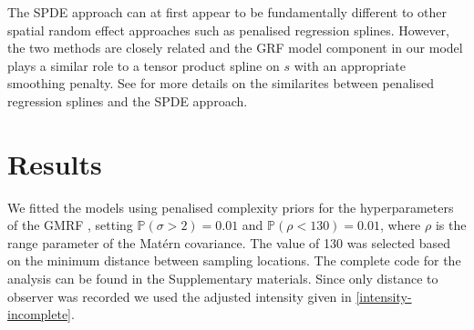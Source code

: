 \documentclass[preprint,12pt]{elsarticle}
\begin{document}
The SPDE approach can at first appear to be fundamentally different to other spatial random effect approaches such as penalised regression splines.  However, the two methods are closely related and the GRF model component in our model plays a similar role to a tensor product spline on $s$ with an appropriate smoothing penalty.  See \cite{yue_bayesian_2014, miller_understanding_2019} for more details on the similarites between penalised regression splines and the SPDE approach.  

\section{Results}

We fitted the models using penalised complexity priors for the hyperparameters of the GMRF \citep{simpson_penalising_2017}, setting $\mathbb{P}(\sigma > 2) = 0.01$ and $\mathbb{P}(\rho < 130) = 0.01$, where $\rho$ is the range parameter of the Mat\'ern covariance.  The value of 130 was selected based on the minimum distance between sampling locations.  The complete code for the analysis can be found in the Supplementary materials.  Since only distance to observer was recorded we used the adjusted intensity given in \eqref{intensity-incomplete}.   
\end{document}
